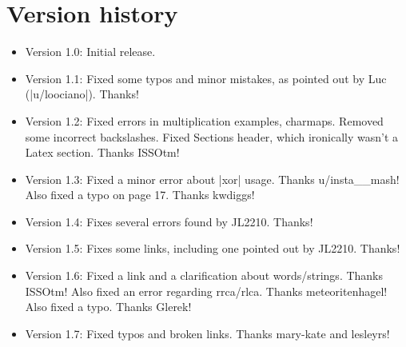 \documentclass[11pt]{book}
\begin{document}
\chapter{Version history}
\begin{itemize}
\item Version 1.0: Initial release.
\item Version 1.1: Fixed some typos and minor mistakes, as pointed out by Luc (|u/loociano|). Thanks!
\item Version 1.2: Fixed errors in multiplication examples, charmaps. Removed some incorrect backslashes. Fixed Sections header, which ironically wasn't a Latex section. Thanks ISSOtm!
\item Version 1.3: Fixed a minor error about |xor| usage. Thanks u/insta\_\_mash! Also fixed a typo on page 17. Thanks kwdiggs!
\item Version 1.4: Fixes several errors found by JL2210. Thanks!
\item Version 1.5: Fixes some links, including one pointed out by JL2210. Thanks!
\item Version 1.6: Fixed a link and a clarification about words/strings. Thanks ISSOtm! Also fixed an error regarding rrca/rlca. Thanks meteoritenhagel! Also fixed a typo. Thanks Glerek!
\item Version 1.7: Fixed typos and broken links. Thanks mary-kate and lesleyrs!
\end{itemize}
\end{document}
